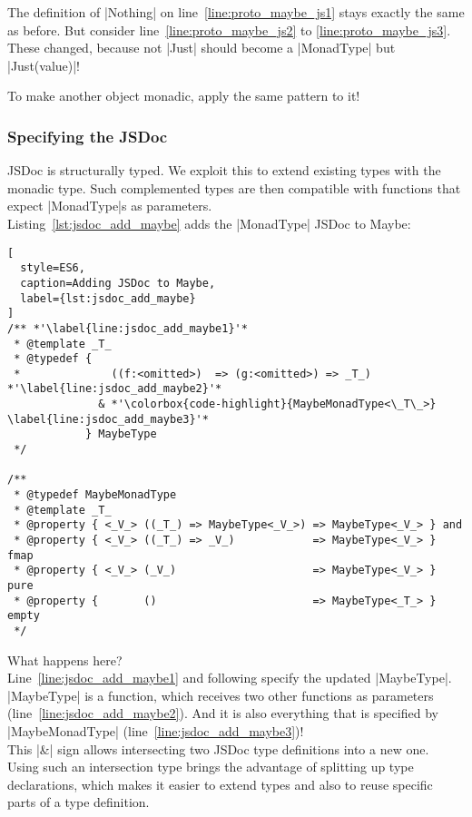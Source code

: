 The definition of |Nothing| on line~\ref{line:proto_maybe_js1} stays exactly
the same as before. But consider line~\ref{line:proto_maybe_js2} to
\ref{line:proto_maybe_js3}. These changed, because not |Just| should become a
|MonadType| but |Just(value)|!

To make another object monadic, apply the same pattern to it!



\subsubsection{Specifying the JSDoc} %
\label{sec:Specify the JSDoc}
JSDoc is structurally typed. We exploit this to extend existing types with
the monadic type. Such complemented types are then compatible with functions
that expect |MonadType|s as parameters. \\ 
Listing~\ref{lst:jsdoc_add_maybe} adds the |MonadType| JSDoc to Maybe:

\begin{lstlisting}[
  style=ES6,
  caption=Adding JSDoc to Maybe,
  label={lst:jsdoc_add_maybe}
]
/** *'\label{line:jsdoc_add_maybe1}'*
 * @template _T_
 * @typedef { 
 *              ((f:<omitted>)  => (g:<omitted>) => _T_) *'\label{line:jsdoc_add_maybe2}'*
              & *'\colorbox{code-highlight}{MaybeMonadType<\_T\_>} \label{line:jsdoc_add_maybe3}'*
            } MaybeType
 */

/** 
 * @typedef MaybeMonadType
 * @template _T_
 * @property { <_V_> ((_T_) => MaybeType<_V_>) => MaybeType<_V_> } and
 * @property { <_V_> ((_T_) => _V_)            => MaybeType<_V_> } fmap
 * @property { <_V_> (_V_)                     => MaybeType<_V_> } pure
 * @property {       ()                        => MaybeType<_T_> } empty
 */
\end{lstlisting}

What happens here? \\ 
Line~\ref{line:jsdoc_add_maybe1} and following specify the updated |MaybeType|.
|MaybeType| is a function, which receives two other functions as parameters
(line~\ref{line:jsdoc_add_maybe2}). And it is also everything that is specified by
|MaybeMonadType| (line~\ref{line:jsdoc_add_maybe3})! \\
This |&| sign allows intersecting two JSDoc type definitions into a new one.\\

Using such an intersection type brings the advantage of splitting up type
declarations, which makes it easier to extend types and also to reuse specific
parts of a type definition.

